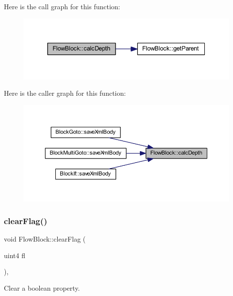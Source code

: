 Here is the call graph for this function\+:
\nopagebreak
\begin{figure}[H]
\begin{center}
\leavevmode
\includegraphics[width=337pt]{class_flow_block_af611c90c1974b257161c37860065c011_cgraph}
\end{center}
\end{figure}
Here is the caller graph for this function\+:
\nopagebreak
\begin{figure}[H]
\begin{center}
\leavevmode
\includegraphics[width=350pt]{class_flow_block_af611c90c1974b257161c37860065c011_icgraph}
\end{center}
\end{figure}
\mbox{\label{class_flow_block_afd95b45dd6c78be77ad477386fe691db}} 
\subsubsection{\texorpdfstring{clearFlag()}{clearFlag()}}
{\footnotesize\ttfamily void Flow\+Block\+::clear\+Flag (\begin{DoxyParamCaption}\item[{uint4}]{fl }\end{DoxyParamCaption})\hspace{0.3cm}{\ttfamily [inline]}, {\ttfamily [protected]}}



Clear a boolean property. 



